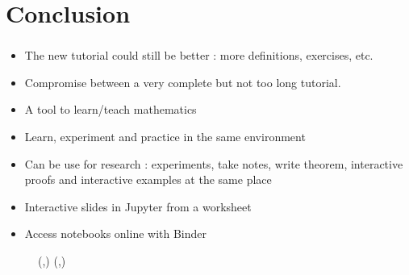 \documentclass[10pt]{beamer}
\newcommand{\blue}[1]{{\color[rgb]{0,0.4,1}{#1}}}
\newcommand{\red}[1]{{\color{red}{#1}}}
\newcommand{\green}[1]{{\color[rgb]{0,0.55,0.25}{#1}}}
\newcommand{\purple}[1]{{\color[rgb]{.7,.2,1}{#1}}}
\newcommand{\orange}[1]{{\color[rgb]{1,.35,0}{#1}}}
\newcommand{\bigtableau}{\YFrench \Yboxdim{28pt}\young}
\begin{document}
\section{Conclusion}

\begin{frame}\frametitle{\orange{Conclusion}}

\begin{itemize}
	\item The new tutorial could still be better : more definitions, exercises, etc.
	\item Compromise between a very complete but not too long tutorial.\newline
	
	\item A tool to learn/teach mathematics
	\item Learn, experiment and practice in the same environment
	\item Can be use for research : experiments, take notes, write theorem, interactive proofs and interactive examples at the same place
	\item Interactive slides in Jupyter from a worksheet
	\item Access notebooks online with Binder 
\end{itemize}

\end{frame}

\begin{frame}
\Huge
\begin{figure}[h]
	\bigtableau({\purple{h}}{\red{a}}{\orange{n}}{\green{k}},{\blue{T}})\hspace*{0cm} \bigtableau({\red{o}}{\orange{u}},{\purple{Y}})
\end{figure}
\end{frame}


\setcounter{lastframe}{\insertframenumber}
\setcounter{framenumber}{\thelastframe}
\end{document}
